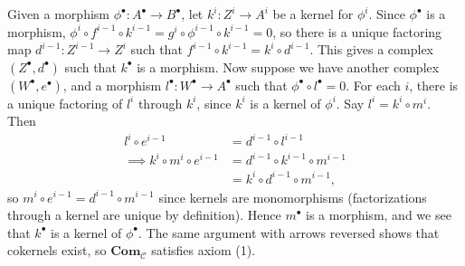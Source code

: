 \documentclass{report}
\newcommand{\cat}[1]{\mathbf{#1}} %
\newcommand{\scrC}{\mathscr{C}}
\begin{document}
\begin{enumerate}[label=\textbf{1.6.\Alph*.}]
	      Given a morphism $\phi^\bullet:A^\bullet\to B^\bullet$, let
	      $k^i:Z^i\to A^i$ be a kernel for $\phi^i$. Since $\phi^\bullet$ is a
	      morphism, $\phi^i\circ f^{i-1}\circ k^{i-1}=g^i\circ\phi^{i-1}\circ k^{i-1}=0$,
	      so there is a unique factoring map $d^{i-1}:Z^{i-1}\to Z^i$ such that
	      $f^{i-1}\circ k^{i-1}=k^i\circ d^{i-1}$. This gives a complex
	      $(Z^\bullet,d^\bullet)$ such that $k^\bullet$ is a morphism. Now suppose
	      we have another complex $(W^\bullet,e^\bullet)$, and a morphism
	      $l^\bullet:W^\bullet\to A^\bullet$ such that
	      $\phi^\bullet\circ l^\bullet=0$. For each $i$, there is a unique
	      factoring of $l^i$ through $k^i$, since $k^i$ is a kernel of $\phi^i$.
	      Say $l^i=k^i\circ m^i$. Then
	      \begin{align*}
		      l^i\circ e^{i-1}                   & = d^{i-1}\circ l^{i-1}              \\
		      \implies k^i\circ m^i\circ e^{i-1} & = d^{i-1}\circ k^{i-1}\circ m^{i-1} \\
		                                         & = k^i\circ d^{i-1}\circ m^{i-1},
	      \end{align*}
	      so $m^i\circ e^{i-1}=d^{i-1}\circ m^{i-1}$ since kernels are
	      monomorphisms (factorizations through a kernel are unique by definition).
	      Hence $m^\bullet$ is a morphism, and we see that $k^\bullet$ is a kernel
	      of $\phi^\bullet$. The same argument with arrows reversed shows that
	      cokernels exist, so $\cat{Com}_\scrC$ satisfies axiom (1).


\end{enumerate}
\end{document}
